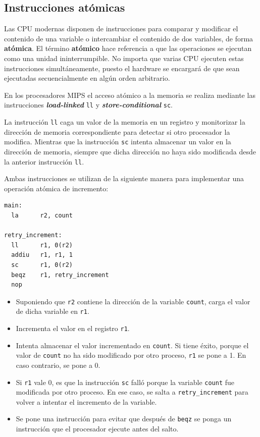 \subsection{Instrucciones atómicas}\label{_instrucciones_atuxf3micas}

{} Las CPU modernas disponen de instrucciones para comparar y modificar
el contenido de una variable o intercambiar el contenido de dos
variables, de forma \textbf{{}atómica}. El término \textbf{atómico} hace
referencia a que las operaciones se ejecutan como una unidad
ininterrumpible. No importa que varias CPU ejecuten estas instrucciones
simultáneamente, puesto el hardware se encargará de que sean ejecutadas
secuencialmente en algún orden arbitrario.

En los procesadores MIPS el acceso atómico a la memoria se realiza
mediante las instrucciones \textbf{\emph{load-linked}} \texttt{ll} y
\textbf{\emph{store-conditional}} \texttt{sc}.

La instrucción \texttt{ll} caga un valor de la memoria en un registro y
monitorizar la dirección de memoria correspondiente para detectar si
otro procesador la modifica. Mientras que la instrucción \texttt{sc}
intenta almacenar un valor en la dirección de memoria, siempre que dicha
dirección no haya sido modificada desde la anterior instrucción
\texttt{ll}.

Ambas instrucciones se utilizan de la siguiente manera para implementar
una operación atómica de incremento:

\begin{verbatim}
main:
  la      r2, count

retry_increment:
  ll      r1, 0(r2)                 
  addiu   r1, r1, 1                 
  sc      r1, 0(r2)                 
  beqz    r1, retry_increment       
  nop                               
\end{verbatim}

\begin{itemize}
\item
  Suponiendo que \texttt{r2} contiene la dirección de la variable
  \texttt{count}, carga el valor de dicha variable en \texttt{r1}.
\item
  Incrementa el valor en el registro \texttt{r1}.
\item
  Intenta almacenar el valor incrementado en \texttt{count}. Si tiene
  éxito, porque el valor de \texttt{count} no ha sido modificado por
  otro proceso, \texttt{r1} se pone a 1. En caso contrario, se pone a 0.
\item
  Si \texttt{r1} vale 0, es que la instrucción \texttt{sc} falló porque
  la variable \texttt{count} fue modificada por otro proceso. En ese
  caso, se salta a \texttt{retry\_increment} para volver a intentar el
  incremento de la variable.
\item
  Se pone una instrucción para evitar que después de \texttt{beqz} se
  ponga un instrucción que el procesador ejecute antes del salto.
\end{itemize}

